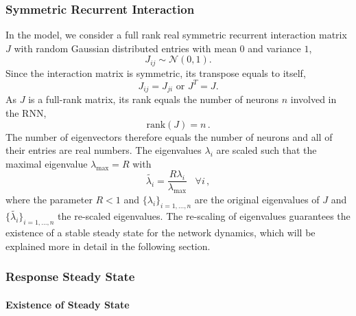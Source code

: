 \documentclass[11pt]{article}
\begin{document}
	\subsubsection{Symmetric Recurrent Interaction} \label{sec:symmetric_recurrent_interaction}
	In the model, we consider a full rank real symmetric recurrent interaction matrix $J$ with random Gaussian distributed entries with mean $0$ and variance $1$,
		\begin{equation} \label{eq:gaussian_distribution}
			{J_{ij}} \sim \mathcal{N}(0, 1).
		\end{equation}
	Since the interaction matrix is symmetric, its transpose equals to itself,
		\begin{equation}
			J_{ij} = J_{ji} \text{ or } J^T = J .
		\end{equation}
	As $J$ is a full-rank matrix, its rank equals the number of neurons $n$ involved in the RNN, 
		\begin{equation}
			\text{rank} (J) = n \, . 
		\end{equation}
	The number of eigenvectors therefore equals the number of neurons and all of their entries are real numbers. 
 	The eigenvalues $\lambda_i$ are scaled such that the maximal eigenvalue $\lambda_{\text{max}} = R$ with
		\begin{equation} \label{eq:eigval_normal}
			\tilde{\lambda_i} = \frac{R \lambda_i}{\lambda_{\text{max}}} \, \, \, \, \, \forall i \, ,
		\end{equation}
	where the parameter $R<1$ and $\{\lambda_i\}_{i=1, ..., n}$ are the original eigenvalues of $J$ and $\{\tilde{\lambda_i}\}_{i = 1,...,n}$ the re-scaled eigenvalues. The re-scaling of eigenvalues guarantees the existence of a stable steady state for the network dynamics, which will be explained more in detail in the following section.
	
	\subsubsection{Response Steady State} \label{sec:steady_state_response_sym}
	
	\paragraph{Existence of Steady State}
	
\end{document}
